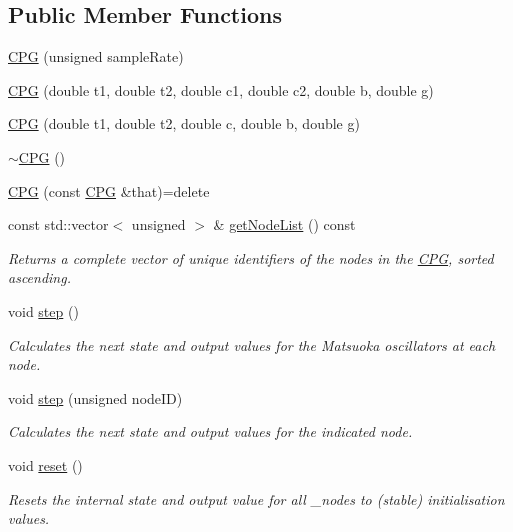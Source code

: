 \subsection*{Public Member Functions}
\begin{DoxyCompactItemize}
\item 
\hyperlink{classCPG_a53baf614a79f4178180be5d7120337d4}{C\+PG} (unsigned sample\+Rate)
\item 
\hyperlink{classCPG_a6e797fd36e726758e82cca4207083c5f}{C\+PG} (double t1, double t2, double c1, double c2, double b, double g)
\item 
\hyperlink{classCPG_a8543be2f663d6b5e79a97745f0d83cd7}{C\+PG} (double t1, double t2, double c, double b, double g)
\item 
\hyperlink{classCPG_aa2cac8504168c1b0190ecc4760ef0cbe}{$\sim$\+C\+PG} ()
\item 
\hyperlink{classCPG_a4f5aad687b3696340237e7669efe65b6}{C\+PG} (const \hyperlink{classCPG}{C\+PG} \&that)=delete
\item 
const std\+::vector$<$ unsigned $>$ \& \hyperlink{classCPG_a2cdaa44b835ee1152cae0815b3667a7c}{get\+Node\+List} () const 
\begin{DoxyCompactList}\small\item\em Returns a complete vector of unique identifiers of the nodes in the \hyperlink{classCPG}{C\+PG}, sorted ascending. \end{DoxyCompactList}\item 
void \hyperlink{classCPG_a14fdef2f92467c2d7727c9fa0a02a07a}{step} ()
\begin{DoxyCompactList}\small\item\em Calculates the next state and output values for the Matsuoka oscillators at each node. \end{DoxyCompactList}\item 
void \hyperlink{classCPG_ac74c71bc2a70610706b3939673a60b3a}{step} (unsigned node\+ID)
\begin{DoxyCompactList}\small\item\em Calculates the next state and output values for the indicated node. \end{DoxyCompactList}\item 
void \hyperlink{classCPG_ae8f7953090be35f7da520c19ad6825b9}{reset} ()
\begin{DoxyCompactList}\small\item\em Resets the internal state and output value for all \+\_\+nodes to (stable) initialisation values. \end{DoxyCompactList}\item 

\end{DoxyCompactItemize}
